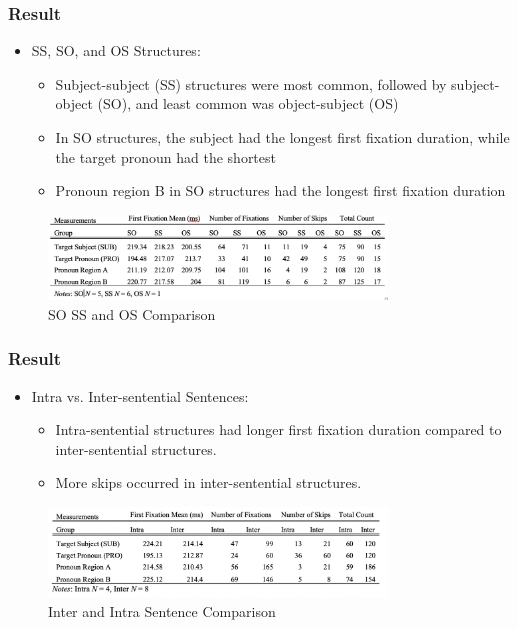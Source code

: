 \documentclass{beamer}
\begin{document}
\begin{frame}
\frametitle{Result}
\begin{itemize}
\item SS, SO, and OS Structures:
\begin{itemize}
 \item Subject-subject (SS) structures were most common, followed by subject-object (SO), and least common was object-subject (OS)
 \item In SO structures, the subject had the longest first fixation duration, while the target pronoun had the shortest
 \item Pronoun region B in SO structures had the longest first fixation duration
 
\end{itemize}
\end{itemize}
\begin{figure}
    \centering
\includegraphics[width=9cm,keepaspectratio]{figures/SO_SS_OD.png}
    \caption{SO SS and OS Comparison}
    \label{table:SO SS and OS Comparison}
\end{figure}
\end{frame}

\begin{frame}
\frametitle{Result}
\begin{itemize}
 \item Intra vs. Inter-sentential Sentences:
 \begin{itemize}
 \item Intra-sentential structures had longer first fixation duration compared to inter-sentential structures.
 \item More skips occurred in inter-sentential structures.
\end{itemize}
\end{itemize}
 \begin{figure}
    \centering
    \includegraphics[width=9cm,keepaspectratio]{figures/Inter_Intra.png}
    \item \caption{Inter and Intra Sentence Comparison}
    \label{table:Inter and Intra Sentence Comparison}
\end{figure}
\end{frame}
\end{document}

